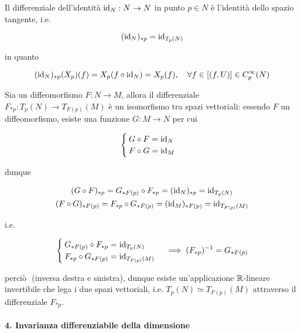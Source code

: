 Il differenziale dell'identità $ \operatorname{id}_{N} : N \to N $ in punto $ p \in N $ è l'identità dello spazio tangente, i.e.
	
\begin{equation}
	(\operatorname{id}_{N})_{*p} = \operatorname{id}_{T_{p}(N)}
\end{equation}

in quanto

\begin{equation}
		(\id_{N})_{*p} (X_{p})(f) = X_{p} (f \circ \id_{N}) %
		= X_{p}(f) %
		\qcomma \forall f \in [(f,U)] \in C^{\infty}_{p}(N)
\end{equation}

Sia un diffeomorfismo $ F : N \to M $, allora il differenziale $ F_{*p} : T_{p}(N) \to T_{F(p)}(M) $ è un isomorfismo tra spazi vettoriali: essendo $ F $ un diffeomorfismo, esiste una funzione $ G : M \to N $ per cui

\begin{equation}
	\begin{cases}
		G \circ F = \operatorname{id}_{N} \\
		F \circ G = \operatorname{id}_{M}
	\end{cases}
\end{equation}

dunque

\begin{gather}
	(G \circ F)_{*p} = G_{*F(p)} \circ F_{*p} %
	= (\id_{N})_{*p} %
	= \id_{T_{p}(N)} \\
	(F \circ G)_{*F(p)} = F_{*p} \circ G_{*F(p)} %
	= (\id_{M})_{*F(p)} %
	= \id_{T_{F(p)}(M)}
\end{gather}

i.e.

\begin{equation}
	\begin{cases}
		G_{*F(p)} \circ F_{*p} = \id_{T_{p}(N)} \\
		F_{*p} \circ G_{*F(p)} = \id_{T_{F(p)}(M)}
	\end{cases}%
	\implies %
	(F_{*p})^{-1} = G_{*F(p)}
\end{equation}

perciò $  $ (inversa destra e sinistra), dunque esiste un'applicazione $ \mathbb{R} $-lineare invertibile che lega i due spazi vettoriali, i.e. $ T_{p}(N) \simeq T_{F(p)}(M) $ attraverso il differenziale $ F_{*p} $.

\paragraph{4. Invarianza differenziabile della dimensione}

